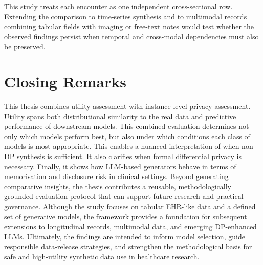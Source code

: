 This study treats each encounter as one independent cross-sectional row.
Extending the comparison to time-series synthesis
\cite{dash2020medical,bhanot2022investigating} and to multimodal records
combining tabular fields with imaging or free-text notes would test whether the
observed findings persist when temporal and cross-modal dependencies must also
be preserved.

\section{Closing Remarks}
\label{sec:conclusion:closing}

This thesis combines utility assessment with instance-level privacy assessment. 
Utility spans both distributional similarity to the real data and predictive 
performance of downstream models. This combined evaluation determines not only 
which models perform best, but also under which conditions each class of models 
is most appropriate. This enables a nuanced interpretation of when non-DP 
synthesis is sufficient. It also clarifies when formal differential privacy 
is necessary. Finally, it shows how LLM-based generators behave in terms of 
memorisation and disclosure risk in clinical settings. Beyond generating 
comparative insights, the thesis contributes a
reusable, methodologically grounded evaluation protocol that can support
future research and practical governance. Although the study focuses on
tabular EHR-like data and a defined set of generative models, the framework
provides a foundation for subsequent extensions to longitudinal records,
multimodal data, and emerging DP-enhanced LLMs. Ultimately, the findings are
intended to inform model selection, guide responsible data-release strategies,
and strengthen the methodological basis for safe and high-utility synthetic
data use in healthcare research.

\cleardoublepage

